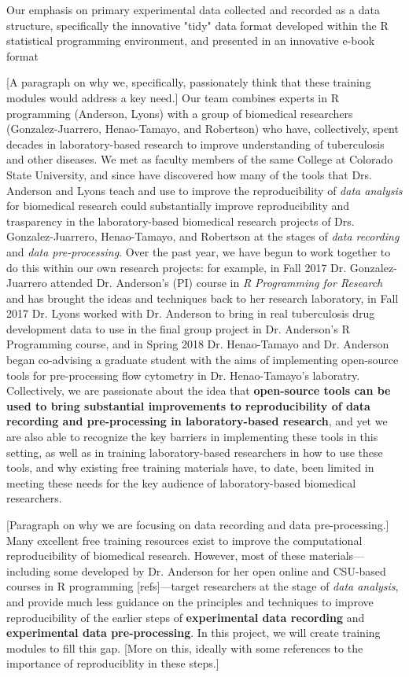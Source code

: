 \documentclass[pdftex,english,11pt,parskip=half]{scrartcl}
\begin{document}
Our emphasis on primary experimental data collected and recorded as a data
structure, specifically the innovative "tidy" data format developed within the R
statistical programming environment, and presented in an innovative e-book
format

[A paragraph on why we, specifically, passionately think that these training
modules would address a key need.] Our team combines experts in R programming
(Anderson, Lyons) with a group of biomedical researchers (Gonzalez-Juarrero,
Henao-Tamayo, and Robertson) who have, collectively, spent decades in
laboratory-based research to improve understanding of tuberculosis and other
diseases. We met as faculty members of the same College at Colorado State
University, and since have discovered how many of the tools that Drs. Anderson
and Lyons teach and use to improve the reproducibility of \textit{data analysis}
for biomedical research could substantially improve reproducibility and
trasparency in the laboratory-based biomedical research projects of Drs.
Gonzalez-Juarrero, Henao-Tamayo, and Robertson at the stages of \textit{data
recording} and \textit{data pre-processing}. Over the past year, we have begun
to work together to do this within our own research projects: for example, in
Fall 2017 Dr. Gonzalez-Juarrero attended Dr. Anderson's (PI) course in \textit{R
Programming for Research} and has brought the ideas and techniques back to her
research laboratory, in Fall 2017 Dr. Lyons worked with Dr. Anderson to bring in
real tuberculosis drug development data to use in the final group project in Dr.
Anderson's R Programming course, and in Spring 2018 Dr. Henao-Tamayo and Dr.
Anderson began co-advising a graduate student with the aims of implementing
open-source tools for pre-processing flow cytometry in Dr. Henao-Tamayo's
laboratry. Collectively, we are passionate about the idea that
\textbf{open-source tools can be used to bring substantial improvements to
reproducibility of data recording and pre-processing in laboratory-based
research}, and yet we are also able to recognize the key barriers in
implementing these tools in this setting, as well as in training
laboratory-based researchers in how to use these tools, and why existing free
training materials have, to date, been limited in meeting these needs for the
key audience of laboratory-based biomedical researchers. 

[Paragraph on why we are focusing on data recording and data pre-processing.]
Many excellent free training resources exist to improve the computational
reproducibility of biomedical research. However, most of these
materials---including some developed by Dr. Anderson for her open online and
CSU-based courses in R programming [refs]---target researchers at the stage of
\textit{data analysis}, and provide much less guidance on the principles and
techniques to improve reproducibility of the earlier steps of
\textbf{experimental data recording} and \textbf{experimental data
pre-processing}. In this project, we will create training modules to fill this
gap. [More on this, ideally with some references to the importance of
reproduciblity in these steps.]
\end{document}
